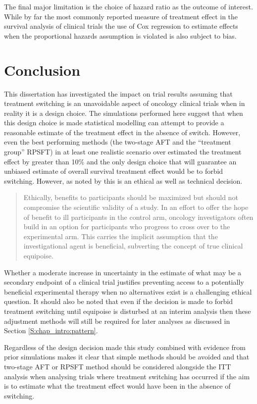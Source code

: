 The final major limitation is the choice of hazard ratio as the outcome of interest. While by far the most commonly reported measure of treatment effect in the survival analysis of clinical trials the use of Cox regression to estimate effects when the proportional hazards assumption is violated is also subject to bias.

\section{Conclusion}

This dissertation has investigated the impact on trial results assuming that treatment switching is an unavoidable aspect of oncology clinical trials when in reality it is a design choice. The simulations performed here suggest that when this design choice is made statistical modelling can attempt to provide a reasonable estimate of the treatment effect in the absence of switch. However, even the best performing methods (the two-stage AFT and the ``treatment group'' RPSFT) in at least one realistic scenario over estimated the treatment effect by greater than 10\% and the only design choice that will guarantee an unbiased estimate of overall survival treatment effect would be to forbid switching. However, as noted by \cite{Prasad2014} this is an ethical as well as technical decision. 
\begin{quote}
Ethically, benefits to participants should be maximized but should not compromise the scientific validity of a study. In an effort to offer the hope of benefit to ill participants in the control arm, oncology investigators often build in an option for participants who progress to cross over to the experimental arm. This carries the implicit assumption that the investigational agent is beneficial, subverting the concept of true clinical equipoise.
\end{quote}
Whether a moderate increase in uncertainty in the estimate of what may be a secondary endpoint of a clinical trial justifies preventing access to a potentially beneficial experimental therapy when no alternatives exist is a challenging ethical question. It should also be noted that even if the decision is made to forbid treatment switching until equipoise is disturbed at an interim analysis then these adjustment methods will still be required for later analyses as discussed in Section \ref{S:chap_intro:pattern}. 

Regardless of the design decision made this study combined with evidence from prior simulations makes it clear that simple methods should be avoided and that two-stage AFT or RPSFT method should be considered alongside the ITT analysis when analysing trials where treatment switching has occurred if the aim is to estimate what the treatment effect would have been in the absence of switching. 
